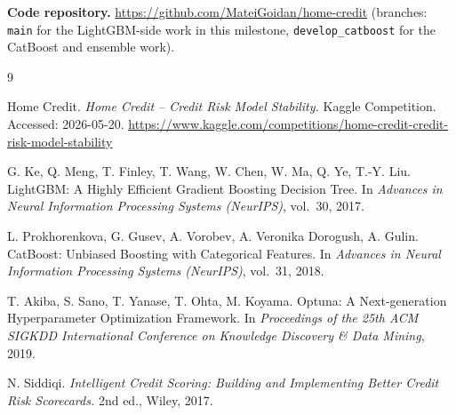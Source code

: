 \documentclass[11pt]{article}
\begin{document}
\textbf{Code repository.} \url{https://github.com/MateiGoidan/home-credit} (branches: \texttt{main} for the LightGBM-side work in this milestone, \texttt{develop\_catboost} for the CatBoost and ensemble work).

\begin{thebibliography}{9}

Home Credit.
\newblock \emph{Home Credit -- Credit Risk Model Stability.}
\newblock Kaggle Competition. Accessed: 2026-05-20.
\newblock \url{https://www.kaggle.com/competitions/home-credit-credit-risk-model-stability}

G. Ke, Q. Meng, T. Finley, T. Wang, W. Chen, W. Ma, Q. Ye, T.-Y. Liu.
\newblock LightGBM: A Highly Efficient Gradient Boosting Decision Tree.
\newblock In \emph{Advances in Neural Information Processing Systems (NeurIPS)}, vol.~30, 2017.

L. Prokhorenkova, G. Gusev, A. Vorobev, A. Veronika Dorogush, A. Gulin.
\newblock CatBoost: Unbiased Boosting with Categorical Features.
\newblock In \emph{Advances in Neural Information Processing Systems (NeurIPS)}, vol.~31, 2018.

T. Akiba, S. Sano, T. Yanase, T. Ohta, M. Koyama.
\newblock Optuna: A Next-generation Hyperparameter Optimization Framework.
\newblock In \emph{Proceedings of the 25th ACM SIGKDD International Conference on Knowledge Discovery \& Data Mining}, 2019.

N. Siddiqi.
\newblock \emph{Intelligent Credit Scoring: Building and Implementing Better Credit Risk Scorecards.}
\newblock 2nd ed., Wiley, 2017.

\end{thebibliography}
\end{document}
